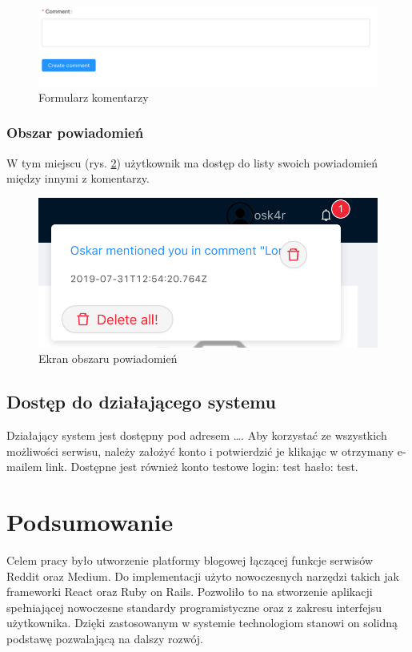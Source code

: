 \documentclass[declaration,shortabstract]{iithesis}
\begin{document}
\begin{figure}
    \centering
    \includegraphics[width=\linewidth]{images/komentarz.png}
    \caption{Formularz komentarzy}
    \label{fig:comment}
\end{figure}

\subsection{Obszar powiadomień}
W tym miejscu (rys. \ref{fig:notification}) użytkownik ma dostęp do listy swoich powiadomień między innymi z komentarzy.
\begin{figure}
    \centering
    \includegraphics[width=\linewidth]{images/powiadomienia.png}
    \caption{Ekran obszaru powiadomień}
    \label{fig:notification}
\end{figure}

\section{Dostęp do działającego systemu}
Działający system jest dostępny pod adresem \ldots. Aby korzystać ze wszystkich możliwości serwisu, należy założyć konto i potwierdzić je klikając w otrzymany e-mailem link. Dostępne jest również konto testowe login: test hasło: test.

\chapter{Podsumowanie}
Celem pracy było utworzenie platformy blogowej łączącej funkcje serwisów Reddit oraz Medium. Do implementacji użyto nowoczesnych narzędzi takich jak frameworki React oraz Ruby on Rails. Pozwoliło to na stworzenie aplikacji spełniającej nowoczesne standardy programistyczne oraz z zakresu interfejsu użytkownika. Dzięki zastosowanym w systemie technologiom stanowi on solidną podstawę pozwalającą na dalszy rozwój. 
\end{document}
